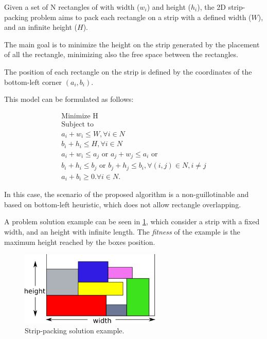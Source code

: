Given a set of N rectangles of with width ($w_{i}$) and height ($h_{i}$),
the 2D strip-packing problem aims to pack each rectangle on a strip
with a defined width ($W$), and an infinite height ($H$).

The main goal is to minimize the height on the strip
generated by the placement of all the rectangle,
minimizing also the free space between the rectangles.

The position of each rectangle on the strip is defined
by the coordinates of the bottom-left corner $(a_{i},b_{i})$.

This model can be formulated as follows:

\begin{eqnarray}
\text{Minimize H}\nonumber \\
\text{Subject to}\nonumber \\
a_{i} + w_{i} \leq W, \forall i \in N \\
b_{i} + h_{i} \leq H, \forall i \in N \\
a_{i} + w_{i} \leq a_{j}\text{ or }a_{j} + w_{j} \leq a_{i}\text{ or }\nonumber\\
b_{i} + h_{i} \leq b_{j}\text{ or }b_{j} + h_{j} \leq b_{i}, \forall (i,j) \in N, i\neq j\\
a_{i} + b_{i} \geq 0. \forall i \in N.
\end{eqnarray}

In this case,
the scenario of the proposed algorithm is a non-guillotinable
and based on bottom-left heuristic, which does not allow rectangle overlapping.

A problem solution example can be seen in \ref{fig:strip-packing},
which consider a strip with a fixed width, and an height with infinite length.
The \emph{fitness} of the example is the maximum height reached
by the boxes position.

\begin{figure}
    \centering
    \includegraphics[width=0.6\textwidth]{img/ia-strip_packing}
    \caption{Strip-packing solution example.}
    \label{fig:strip-packing}
\end{figure}
